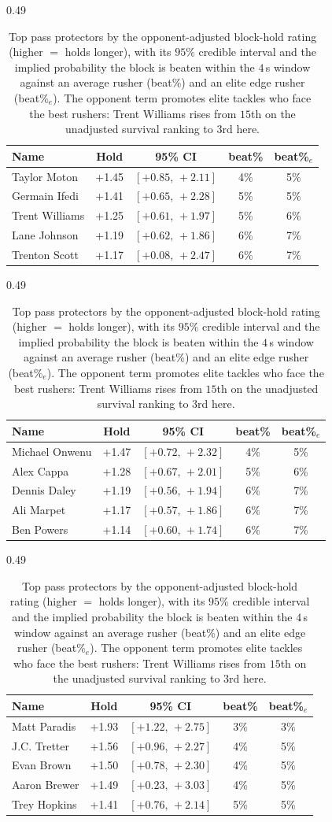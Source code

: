\begin{table}[h!]
\centering
\begin{subtable}{0.49\textwidth}
\centering
\footnotesize
\begin{tabular}{lcccc}
\toprule
Name & Hold & 95\% CI & beat\% & beat\%$_{e}$ \\
\midrule
Taylor Moton & +1.45 & $[+0.85,\,+2.11]$ & 4\% & 5\% \\
Germain Ifedi & +1.41 & $[+0.65,\,+2.28]$ & 5\% & 5\% \\
Trent Williams & +1.25 & $[+0.61,\,+1.97]$ & 5\% & 6\% \\
Lane Johnson & +1.19 & $[+0.62,\,+1.86]$ & 6\% & 7\% \\
Trenton Scott & +1.17 & $[+0.08,\,+2.47]$ & 6\% & 7\% \\
\bottomrule
\end{tabular}
\caption{T}
\end{subtable}
\hfill
\begin{subtable}{0.49\textwidth}
\centering
\footnotesize
\begin{tabular}{lcccc}
\toprule
Name & Hold & 95\% CI & beat\% & beat\%$_{e}$ \\
\midrule
Michael Onwenu & +1.47 & $[+0.72,\,+2.32]$ & 4\% & 5\% \\
Alex Cappa & +1.28 & $[+0.67,\,+2.01]$ & 5\% & 6\% \\
Dennis Daley & +1.19 & $[+0.56,\,+1.94]$ & 6\% & 7\% \\
Ali Marpet & +1.17 & $[+0.57,\,+1.86]$ & 6\% & 7\% \\
Ben Powers & +1.14 & $[+0.60,\,+1.74]$ & 6\% & 7\% \\
\bottomrule
\end{tabular}
\caption{G}
\end{subtable}

\bigskip
\begin{subtable}{0.49\textwidth}
\centering
\footnotesize
\begin{tabular}{lcccc}
\toprule
Name & Hold & 95\% CI & beat\% & beat\%$_{e}$ \\
\midrule
Matt Paradis & +1.93 & $[+1.22,\,+2.75]$ & 3\% & 3\% \\
J.C. Tretter & +1.56 & $[+0.96,\,+2.27]$ & 4\% & 5\% \\
Evan Brown & +1.50 & $[+0.78,\,+2.30]$ & 4\% & 5\% \\
Aaron Brewer & +1.49 & $[+0.23,\,+3.03]$ & 4\% & 5\% \\
Trey Hopkins & +1.41 & $[+0.76,\,+2.14]$ & 5\% & 5\% \\
\bottomrule
\end{tabular}
\caption{C}
\end{subtable}

\caption{Top pass protectors by the opponent-adjusted block-hold rating (higher $=$ holds longer), with its $95\%$ credible interval and the implied probability the block is beaten within the $4$\,s window against an average rusher (beat\%) and an elite edge rusher (beat\%$_e$). The opponent term promotes elite tackles who face the best rushers: Trent Williams rises from $15$th on the unadjusted survival ranking to $3$rd here.}
\label{tab:block_hold}
\end{table}
